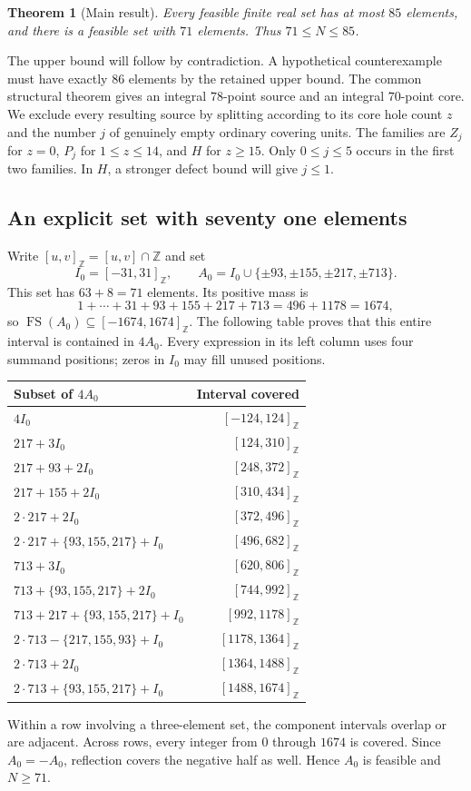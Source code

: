 \documentclass[11pt,letterpaper]{article}
\newcommand{\FS}{\operatorname{FS}}
\newcommand{\Z}{\mathbb Z}\newcommand{\R}{\mathbb R}
\newtheorem{theorem}{Theorem}[section]
\theoremstyle{definition}\newtheorem{definition}[theorem]{Definition}
\begin{document}
\begin{theorem}[Main result]\label{thm:main}
Every feasible finite real set has at most $85$ elements, and there is a feasible set with $71$ elements. Thus $71\le N\le85$.
\end{theorem}
The upper bound will follow by contradiction. A hypothetical counterexample must have exactly $86$ elements by the retained upper bound. The common structural theorem gives an integral $78$-point source and an integral $70$-point core. We exclude every resulting source by splitting according to its core hole count $z$ and the number $j$ of genuinely empty ordinary covering units. The families are $Z_j$ for $z=0$, $P_j$ for $1\le z\le14$, and $H$ for $z\ge15$. Only $0\le j\le5$ occurs in the first two families. In $H$, a stronger defect bound will give $j\le1$.

\subsection{An explicit set with seventy one elements}\label{sec:lower}
Write $[u,v]_{\Z}=[u,v]\cap\Z$ and set
\[
I_0=[-31,31]_{\Z},\qquad
A_0=I_0\cup\{\pm93,\pm155,\pm217,\pm713\}.
\]
This set has $63+8=71$ elements. Its positive mass is
\[
1+\cdots+31+93+155+217+713=496+1178=1674,
\]
so $\FS(A_0)\subseteq[-1674,1674]_{\Z}$. The following table proves that this entire interval is contained in $4A_0$. Every expression in its left column uses four summand positions; zeros in $I_0$ may fill unused positions.
\begin{center}\small
\begin{tabular}{@{}lr@{}}\toprule
Subset of $4A_0$&Interval covered\\\midrule
$4I_0$&$[-124,124]_{\Z}$\\
$217+3I_0$&$[124,310]_{\Z}$\\
$217+93+2I_0$&$[248,372]_{\Z}$\\
$217+155+2I_0$&$[310,434]_{\Z}$\\
$2\cdot217+2I_0$&$[372,496]_{\Z}$\\
$2\cdot217+\{93,155,217\}+I_0$&$[496,682]_{\Z}$\\
$713+3I_0$&$[620,806]_{\Z}$\\
$713+\{93,155,217\}+2I_0$&$[744,992]_{\Z}$\\
$713+217+\{93,155,217\}+I_0$&$[992,1178]_{\Z}$\\
$2\cdot713-\{217,155,93\}+I_0$&$[1178,1364]_{\Z}$\\
$2\cdot713+2I_0$&$[1364,1488]_{\Z}$\\
$2\cdot713+\{93,155,217\}+I_0$&$[1488,1674]_{\Z}$\\\bottomrule
\end{tabular}
\end{center}
Within a row involving a three-element set, the component intervals overlap or are adjacent. Across rows, every integer from $0$ through $1674$ is covered. Since $A_0=-A_0$, reflection covers the negative half as well. Hence $A_0$ is feasible and $N\ge71$.
\end{document}
